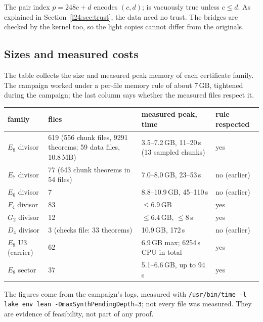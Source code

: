 \begin{dictionary}
The pair index $p=248c+d$ encodes $(c,d)$;  is vacuously true unless $c\le d$. As explained in
Section~\ref{l24:sec:trust}, the data need no trust. The  bridges are checked by the kernel too, so the light copies
cannot differ from the originals.
\end{dictionary}

\subsection{Sizes and measured costs}

The table collects the size and measured peak memory of each certificate family. The campaign worked under a per-file
memory rule of about 7\,GB, tightened during the campaign; the last column says whether the measured files respect it.
\begin{center}\small
\begin{tabular}{p{}p{}p{}p{}}
\toprule
family & files & measured peak, time & rule respected\\
\midrule
$E_8$ divisor & 619 (556 chunk files, 9291 theorems; 59 data files, 10.8\,MB) & 3.5--7.2\,GB, 11--20\,s (13 sampled chunks) & yes\\
$E_7$ divisor & 77 (643 chunk theorems in 54 files) & 7.0--8.0\,GB, 23--53\,s & no (earlier)\\
$E_6$ divisor & 7 & 8.8--10.9\,GB, 45--110\,s & no (earlier)\\
$F_4$ divisor & 83 & $\le6.9$\,GB & yes\\
$G_2$ divisor & 12 & $\le6.4$\,GB, $\le8$\,s & yes\\
$D_4$ divisor & 3 (checks file: 33 theorems) & 10.9\,GB, 172\,s & no (earlier)\\
$E_8$ U3 (carrier) & 62 & 6.9\,GB max; 6254\,s CPU in total & yes\\
$E_8$ sector & 37 & 5.1--6.6\,GB, up to 94\,s & yes\\
\bottomrule
\end{tabular}
\end{center}
The figures come from the campaign's logs, measured with \texttt{/usr/bin/time -l lake env lean -DmaxSynthPendingDepth=3};
not every file was measured. They are evidence of feasibility, not part of any proof.

